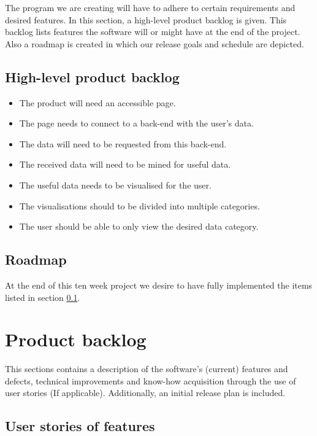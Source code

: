 \documentclass{article}
\begin{document}
The program we are creating will have to adhere to certain requirements and desired features. In this section, a high-level product backlog is given. This backlog lists features the software will or might have at the end of the project. Also a roadmap is created in which our release goals and schedule are depicted. 

    \subsection{High-level product backlog} \label{HL Product BL}
    
    \begin{itemize}
        \item The product will need an accessible page.
        \item The page needs to connect to a back-end with the user's data.
        \item The data will need to be requested from this back-end.
        \item The received data will need to be mined for useful data.
        \item The useful data needs to be visualised for the user.
        \item The visualisations should to be divided into multiple categories.
        \item The user should be able to only view the desired data category.
    \end{itemize}
    
    \subsection{Roadmap}
    
    At the end of this ten week project we desire to have fully implemented the items listed in section \ref{HL Product BL}.
    
\section{Product backlog} 

This sections contains a description of the software's (current) features and defects, technical improvements and know-how acquisition through the use of user stories (If applicable). Additionally, an initial release plan is included.

    \subsection{User stories of features}
    
\end{document}
